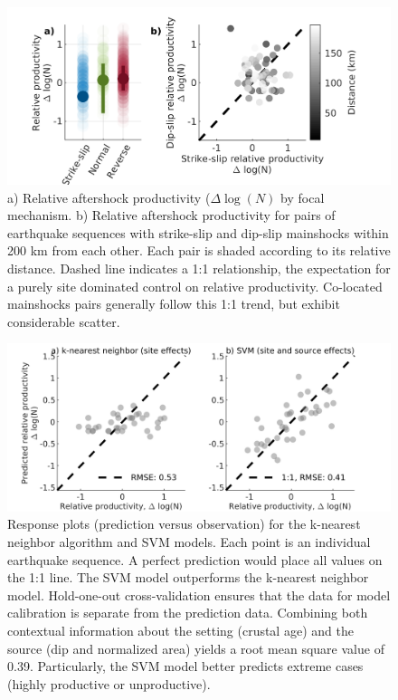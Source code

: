 \documentclass[draft]{agujournal}
\begin{document}
\begin{figure}
\centering
\includegraphics{figures/fmspairs_mw5.png}
\caption{a) Relative aftershock productivity ($\Delta \log(N)$ by focal mechanism. b) Relative aftershock productivity for pairs of earthquake sequences with strike-slip and dip-slip mainshocks within 200 km from each other. Each pair is shaded according to its relative distance. Dashed line indicates a 1:1 relationship, the expectation for a purely site dominated control on relative productivity. Co-located mainshocks pairs generally follow this 1:1 trend, but exhibit considerable scatter.}
\end{figure}

\begin{figure}
\centering
\includegraphics{figures/response_mw5.png}
\caption{Response plots (prediction versus observation) for the k-nearest neighbor algorithm and SVM models. Each point is an individual earthquake sequence. A perfect prediction would place all values on the 1:1 line. The SVM model outperforms the k-nearest neighbor model. Hold-one-out cross-validation ensures that the data for model calibration is separate from the prediction data. Combining both contextual information about the setting (crustal age) and the source (dip and normalized area) yields a root mean square value of 0.39. Particularly, the SVM model better predicts extreme cases (highly productive or unproductive).}
\label{fig:response}
\end{figure}
\end{document}

